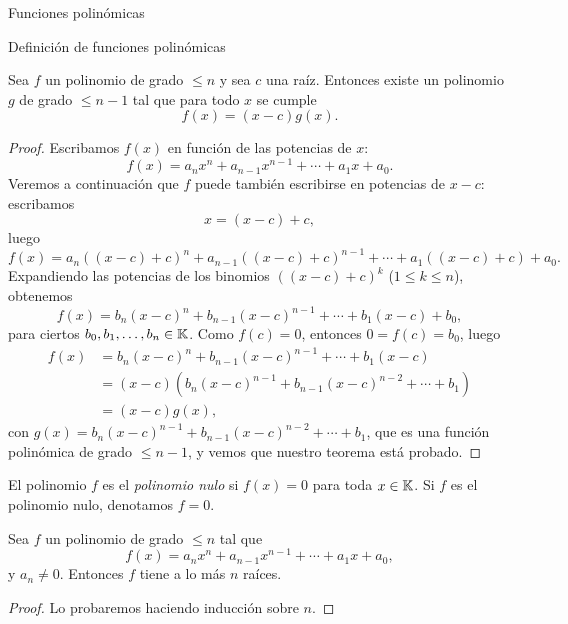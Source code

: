 \begin{chapter}{Funciones polin\'omicas}
\begin{section}{Definici\'on de funciones polin\'omicas}
        \begin{teorema}\label{th-fact-raiz}
             Sea $f$ un polinomio de grado $\le n$ y sea $c$ una raíz. Entonces existe un polinomio $g$ de grado $\le n - 1$ tal que para todo $x$ se cumple
             \begin{equation*}
                 f (x) = (x - c) g (x).
             \end{equation*}
        \end{teorema}
        \begin{proof} Escribamos $f(x)$ en función de las potencias de  $x$:
        \begin{equation*}
            f(x) = a_nx^n + a_{n-1}x^{n-1}+\cdots + a_1x +a_0.
        \end{equation*}
         Veremos a continuación que $f$ puede también escribirse en potencias de $x-c$: escribamos 
         \begin{equation*}
             x = (x-c)+ c,
         \end{equation*}
         luego 
         \begin{equation*}
         f(x) = a_n((x-c)+ c)^n + a_{n-1}((x-c)+ c)^{n-1}+\cdots + a_1((x-c)+ c) +a_0.
         \end{equation*}
         Expandiendo las potencias de los binomios $((x-c)+ c)^k$ ($1 \le k \le n$),  obtenemos
         \begin{equation*}
         f(x) = b_n(x-c)^n + b_{n-1}(x-c)^{n-1}+\cdots + b_1(x-c) +b_0,
         \end{equation*}
         para ciertos $b_0, b_1,\ldots ,b_n \in \mathbb K$. Como $f(c) = 0$,  entonces $0=f(c)=b_0$,  luego 
         \begin{align*}
             f(x) &= b_n(x-c)^n + b_{n-1}(x-c)^{n-1}+\cdots + b_1(x-c) \\
             &= (x-c)(b_n(x-c)^{n-1} + b_{n-1}(x-c)^{n-2}+\cdots + b_1) \\
             &=(x-c)g(x),
         \end{align*}
         con $g(x) =b_n(x-c)^{n-1} + b_{n-1}(x-c)^{n-2}+\cdots + b_1$,  que es una función polinómica de grado $\le n-1$, y vemos que nuestro teorema está probado.
        \end{proof}
            
        El polinomio $f$ es el \textit{polinomio nulo} si $f(x)=0$ para toda $x \in \mathbb K$. Si $f$ es el polinomio nulo,  denotamos $f =0$. 
            
        \begin{teorema}\label{th-pol-raiz}
            Sea $f$ un polinomio de grado $\le n$ tal que
            \begin{equation*}
            f(x) = a_nx^n + a_{n-1}x^{n-1}+\cdots + a_1x +a_0,
            \end{equation*}
            y  $a_n \ne 0$. Entonces $f$ tiene a lo  más  $n$ raíces. 
        \end{teorema}
        \begin{proof} 
            Lo probaremos haciendo inducción sobre $n$. 
            

\end{proof}
\end{section}
\end{chapter}
